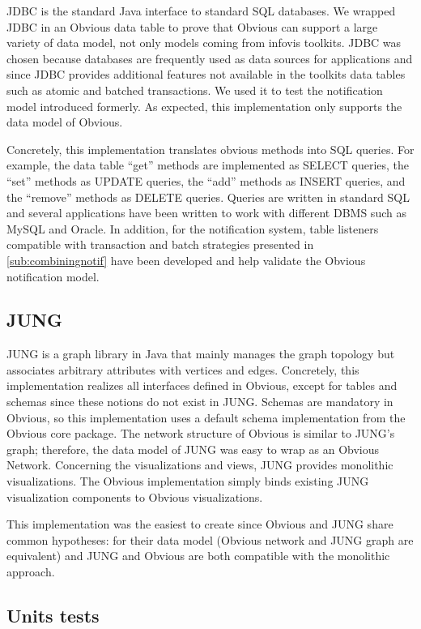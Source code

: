 JDBC is the standard Java interface to standard SQL databases.  We
wrapped JDBC in an Obvious data table to prove that Obvious can
support a large variety of data model, not only models coming from
infovis toolkits.  JDBC was chosen because databases
are frequently used as data sources for applications and since JDBC
provides additional features not available in the toolkits data tables
such as atomic and batched transactions.  We used it to test the
notification model introduced formerly.  As expected, this
implementation only supports the data model of Obvious.

Concretely, this implementation translates obvious methods into SQL
queries.  For example, the data table ``get'' methods are implemented
as SELECT queries, the ``set'' methods as UPDATE queries, the ``add''
methods as INSERT queries, and the ``remove'' methods as DELETE
queries.  Queries are written in standard SQL and several applications
have been written to work with different DBMS such as MySQL and
Oracle.  In addition, for the notification system, table listeners
compatible with transaction and batch strategies presented in
\ref{sub:combiningnotif} have been developed and help validate the
Obvious notification model.

\subsection{JUNG}

JUNG is a graph library in Java that mainly manages the graph topology
but associates arbitrary attributes with vertices and edges.
Concretely, this implementation realizes all interfaces defined in
Obvious, except for tables and schemas since these notions do not
exist in JUNG.  Schemas are mandatory in Obvious, so this
implementation uses a default schema implementation from the Obvious
core package.  The network structure of Obvious is similar to JUNG's
graph; therefore, the data model of JUNG was easy to wrap as an
Obvious Network.  Concerning the visualizations and views, JUNG
provides monolithic visualizations.  The Obvious implementation simply
binds existing JUNG visualization components to Obvious visualizations.

This implementation was the easiest to create since Obvious and JUNG
share common hypotheses: for their data model (Obvious network and
JUNG graph are equivalent) and JUNG and Obvious are both compatible
with the monolithic approach.  

\subsection{Units tests}
\label{sub:unittests}


